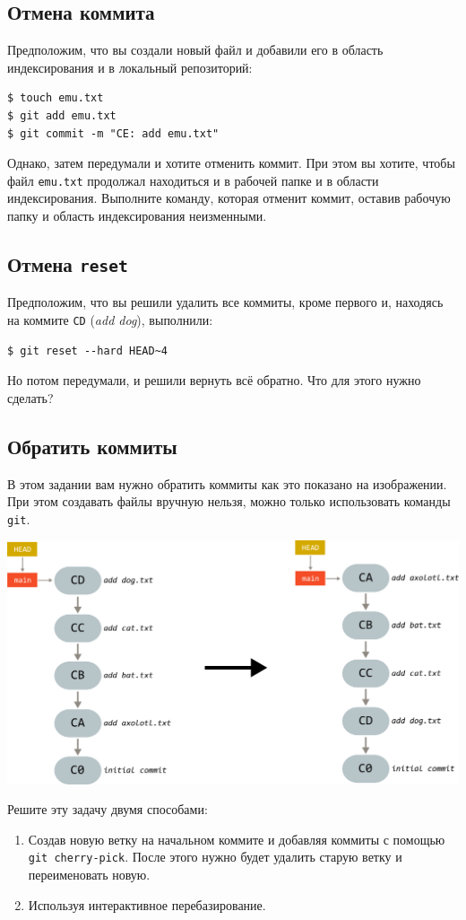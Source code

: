 \documentclass{article}
\begin{document}
\subsection{Отмена коммита}
Предположим, что вы создали новый файл и добавили его в область индексирования и в локальный репозиторий:
\begin{lstlisting}[style=csMiptBash]
$ touch emu.txt
$ git add emu.txt
$ git commit -m "CE: add emu.txt"
\end{lstlisting}
Однако, затем передумали и хотите отменить коммит. При этом вы хотите, чтобы файл \texttt{emu.txt} продолжал находиться и в рабочей папке и в области индексирования. Выполните команду, которая отменит коммит, оставив рабочую папку и область индексирования неизменными.

\subsection{Отмена \texttt{reset}}
Предположим, что вы решили удалить все коммиты, кроме первого и, находясь на коммите \texttt{CD} (\textit{add dog}), выполнили:
\begin{lstlisting}
$ git reset --hard HEAD~4
\end{lstlisting}
Но потом передумали, и решили вернуть всё обратно. Что для этого нужно сделать?


\subsection{Обратить коммиты}
В этом задании вам нужно обратить коммиты как это показано на изображении. При этом создавать файлы вручную нельзя, можно только использовать команды \texttt{git}.
\begin{center}
\includegraphics[scale=0.8]{../images/reverse_animals.png}
\end{center}
Решите эту задачу двумя способами:
\begin{enumerate}
\item Создав новую ветку на начальном коммите и добавляя коммиты с помощью \texttt{git cherry-pick}. После этого нужно будет удалить старую ветку и переименовать новую.
\item Используя интерактивное перебазирование.
\end{enumerate}
\end{document}
